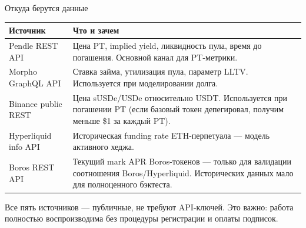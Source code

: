 \documentclass[11pt,aspectratio=169]{beamer}
\begin{document}
\begin{frame}{Откуда берутся данные}
  \footnotesize
  \begin{tabular}{p{3.6cm}p{10.8cm}}
    \toprule
    \textbf{Источник} & \textbf{Что и зачем} \\
    \midrule
    Pendle REST API & Цена PT, implied yield, ликвидность пула, время
    до погашения. Основной канал для PT-метрики. \\
    \addlinespace[2pt]
    Morpho GraphQL API & Ставка займа, утилизация пула, параметр LLTV.
    Используется при моделировании долга. \\
    \addlinespace[2pt]
    Binance public REST & Цена sUSDe/USDe относительно USDT.
    Используется при погашении PT (если базовый токен депегировал,
    получим меньше \$1 за каждый PT). \\
    \addlinespace[2pt]
    Hyperliquid info API & Историческая funding rate ETH-перпетуала ---
    модель активного хеджа. \\
    \addlinespace[2pt]
    Boros REST API & Текущий mark APR Boros-токенов --- только для
    валидации соотношения Boros/Hyperliquid. Исторических данных
    мало для полноценного бэктеста. \\
    \bottomrule
  \end{tabular}

  \vspace{0.4em}
  \normalsize
  Все пять источников --- публичные, не требуют API-ключей. Это
  важно: работа полностью воспроизводима без процедуры регистрации
  и оплаты подписок.
\end{frame}
\end{document}
